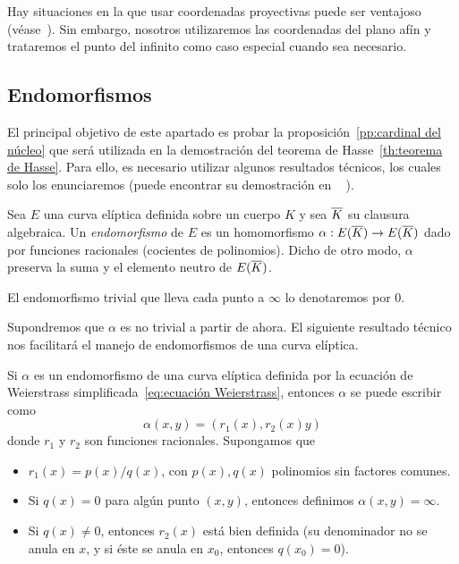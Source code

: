 Hay situaciones en la que usar coordenadas proyectivas puede ser ventajoso (véase~\cite[sec 2.6]{Washington:2008}). Sin embargo, nosotros utilizaremos las coordenadas del plano afín y trataremos el punto del infinito como caso especial cuando sea necesario.

\subsection{Endomorfismos}
\label{sub:Endomorfismos}

El principal objetivo de este apartado es probar la proposición~\ref{pp:cardinal del núcleo} que será utilizada en la demostración del teorema de Hasse~\ref{th:teorema de Hasse}. Para ello, es necesario utilizar algunos resultados técnicos, los cuales solo los enunciaremos (puede encontrar su demostración en ~\cite[sec. 2.9]{Washington:2008} ).

\begin{definicion}
	Sea $E$ una curva elíptica definida sobre un cuerpo $K$ y sea $\overline{K}$ su clausura algebraica. Un \emph{endomorfismo} de $E$ es un homomorfismo $\alpha: E(\overline{K}) \to E(\overline{K})$ dado por funciones racionales (cocientes de polinomios). Dicho de otro modo, $\alpha$ preserva la suma y el elemento neutro de $E(\overline{K})$.

	El endomorfismo trivial que lleva cada punto a $\infty$ lo denotaremos por 0.
\end{definicion}

Supondremos que $\alpha$ es no trivial a partir de ahora. El siguiente resultado técnico nos facilitará el manejo de endomorfismos de una curva elíptica.

\begin{lema}\label{lm:endomorfismo con funciones racionales}
	Si $\alpha$ es un endomorfismo de una curva elíptica definida por la ecuación de Weierstrass simplificada~\eqref{eq:ecuación Weierstrass}, entonces $\alpha$ se puede escribir como
	$$
	\alpha(x, y) = (r_1(x), r_2(x) y)
	$$
	donde $r_1$ y $r_2$ son funciones racionales. Supongamos que
	\begin{itemize}
		\item $r_1(x) = p(x) / q(x)$, con $p(x), q(x)$ polinomios sin factores comunes.
		\item Si $q(x) = 0$ para algún punto $(x, y)$, entonces definimos $\alpha(x, y) = \infty$.
		\item Si $q(x) \neq 0$, entonces $r_2(x)$ está bien definida (su denominador no se anula en $x$, y si éste se anula en $x_0$, entonces $q(x_0) = 0$).
	\end{itemize}
\end{lema}

